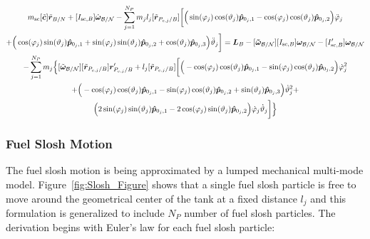\begin{multline}
	m_{\text{sc}}[\tilde{\bm{c}}]\ddot{\bm r}_{B/N}+[I_{\text{sc},B}] \dot{\bm\omega}_{\cal B/N}  - \sum\limits_{j=1}^{N_P}m_j l_j [\tilde{\bm{r}}_{P_{c,j}/B}] \bigg[
	\Big(\sin(\varphi_j)\cos(\vartheta_j)\bm{\hat{p}}_{0_j,1}-\cos(\varphi_j)\cos(\vartheta_j)\bm{\hat{p}}_{0_j,2}\Big)\ddot{\varphi}_j \\
	+\Big(\cos(\varphi_j)\sin(\vartheta_j)\bm{\hat{p}}_{0_j,1}+\sin(\varphi_j)\sin(\vartheta_j)\bm{\hat{p}}_{0_j,2}+\cos(\vartheta_j)\bm{\hat{p}}_{0_j,3} \Big)\ddot{\vartheta}_j
	\bigg] =
	\bm{L}_B-[\bm{\tilde{\omega}}_{\cal B/N}] [I_{\text{sc},B}] \bm\omega_{\cal B/N}
	- [I'_{\text{sc},B}] \bm\omega_{\cal B/N}\\ 	- \sum\limits_{j=1}^{N_P} m_j \Big\{[\tilde{\bm\omega}_{\cal B/N}] [\tilde{\bm{r}}_{P_{c,j}/B}] \bm{r}'_{P_{c,j}/B}+l_j[\tilde{\bm{r}}_{P_{c,j}/B}]\bigg[
	\Big(-\cos(\varphi_j)\cos(\vartheta_j)\bm{\hat{p}}_{0_j,1}-\sin(\varphi_j)\cos(\vartheta_j)\bm{\hat{p}}_{0_j,2}\Big)\dot{\varphi}_j^2 \\
	+\Big(-\cos(\varphi_j)\cos(\vartheta_j)\bm{\hat{p}}_{0_j,1}-\sin(\varphi_j)\cos(\vartheta_j)\bm{\hat{p}}_{0_j,2}+\sin(\vartheta_j)\bm{\hat{p}}_{0_j,3} \Big)\dot{\vartheta}_j^2 +\\
	\Big(2\sin(\varphi_j)\sin(\vartheta_j)\bm{\hat{p}}_{0_j,1} -2\cos(\varphi_j)\sin(\vartheta_j)\bm{\hat{p}}_{0_j,2}\Big)\dot{\varphi}_j\dot{\vartheta}_j
	\bigg]\Big\}
	\label{eq:Final6}
\end{multline}

\subsubsection{Fuel Slosh Motion}
The fuel slosh motion is being approximated by a lumped mechanical multi-mode model. Figure~\ref{fig:Slosh_Figure} shows that a single fuel slosh particle is free to move around the geometrical center of the tank at a fixed distance $l_j$ and this formulation is generalized to include $N_P$ number of fuel slosh particles. The derivation begins with Euler's law for each fuel slosh particle:

